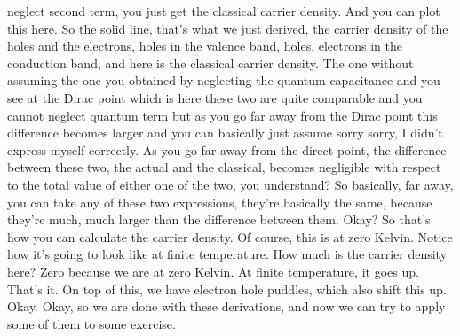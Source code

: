 neglect second term, you just get the classical carrier density. And you can plot this here. So the solid line, that's what we just derived, the carrier density of the holes and the electrons, holes in the valence band, holes, electrons in the conduction band, and here is the classical carrier density. The one without assuming the one you obtained by neglecting the quantum capacitance and you see at the Dirac point which is here these two are quite comparable and you cannot neglect quantum term but as you go far away from the Dirac point this difference becomes larger and you can basically just assume sorry sorry, I didn't express myself correctly. As you go far away from the direct point, the difference between these two, the actual and the classical, becomes negligible with respect to the total value of either one of the two, you understand? So basically, far away, you can take any of these two expressions, they're basically the same, because they're much, much larger than the difference between them. Okay? So that's how you can calculate the carrier density. Of course, this is at zero Kelvin. Notice how it's going to look like at finite temperature. How much is the carrier density here? Zero because we are at zero Kelvin. At finite temperature, it goes up. That's it. On top of this, we have electron hole puddles, which also shift this up. Okay. Okay, so we are done with these derivations, and now we can try to apply some of them to some exercise.
